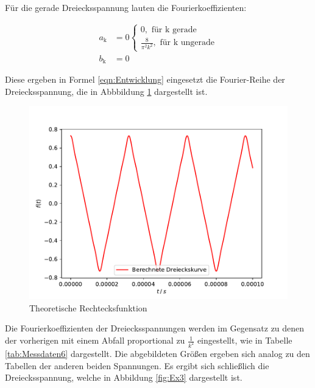Für die gerade Dreiecksspannung lauten die Fourierkoeffizienten:

\begin{align*}
    a_\text{k} &= 0 
        \begin{cases} 
            0, \text{ für k gerade} \\ \frac{8}{\pi^2 k^2}, \text{ für k ungerade}
        \end{cases} \\
    b_\text{k} &= 0
\end{align*}

Diese ergeben in Formel \eqref{eqn:Entwicklung} eingesetzt die Fourier-Reihe
der Dreiecksspannung, die in Abbbildung \ref{fig:Theo3}  dargestellt ist.

\begin{figure}
    \includegraphics[scale = 1.0]{content/plot6.pdf}
    \caption{Theoretische Rechtecksfunktion}
    \label{fig:Theo3}
\end{figure}

Die Fourierkoeffizienten der Dreiecksspannungen werden im Gegensatz zu denen
der vorherigen mit einem Abfall proportional zu $\frac{1}{k^2}$ eingestellt,
wie in Tabelle \ref{tab:Messdaten6} dargestellt. Die abgebildeten
Größen ergeben sich analog zu den Tabellen der anderen beiden Spannungen.
Es ergibt sich schließlich die Dreiecksspannung, welche in Abbildung \ref{fig:Ex3}
dargestellt ist.

